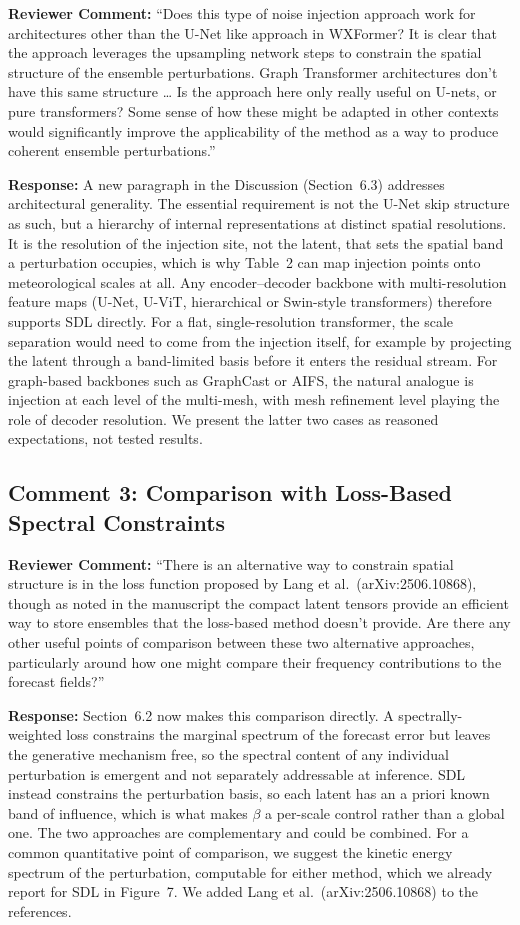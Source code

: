 \documentclass[12pt]{article}
\begin{document}
\textbf{Reviewer Comment:} ``Does this type of noise injection approach work for
architectures other than the U-Net like approach in WXFormer? It is clear that the
approach leverages the upsampling network steps to constrain the spatial structure of
the ensemble perturbations. Graph Transformer architectures don't have this same
structure \ldots{} Is the approach here only really useful on U-nets, or pure
transformers? Some sense of how these might be adapted in other contexts would
significantly improve the applicability of the method as a way to produce coherent
ensemble perturbations.''

\textbf{Response:} A new paragraph in the Discussion (Section~6.3) addresses
architectural generality. The essential requirement is not the U-Net skip
structure as such, but a hierarchy of internal representations at distinct spatial
resolutions. It is the resolution of the injection site, not the latent, that sets the
spatial band a perturbation occupies, which is why Table~2 can map injection points
onto meteorological scales at all. Any encoder--decoder backbone with multi-resolution
feature maps (U-Net, U-ViT, hierarchical or Swin-style transformers) therefore
supports SDL directly. For a flat, single-resolution transformer, the scale separation
would need to come from the injection itself, for example by projecting the
latent through a band-limited basis before it enters the residual stream. For
graph-based backbones such as GraphCast or AIFS, the natural analogue is injection at
each level of the multi-mesh, with mesh refinement level playing the role of decoder
resolution. We present the latter two cases as reasoned expectations, not tested
results.

\subsection*{Comment 3: Comparison with Loss-Based Spectral Constraints}

\textbf{Reviewer Comment:} ``There is an alternative way to constrain spatial
structure is in the loss function proposed by Lang et al.\ (arXiv:2506.10868), though
as noted in the manuscript the compact latent tensors provide an efficient way to
store ensembles that the loss-based method doesn't provide. Are there any other useful
points of comparison between these two alternative approaches, particularly around how
one might compare their frequency contributions to the forecast fields?''

\textbf{Response:} Section~6.2 now makes this comparison directly. A
spectrally-weighted loss constrains the marginal spectrum of the forecast
error but leaves the generative mechanism free, so the spectral content of any
individual perturbation is emergent and not separately addressable at inference. SDL
instead constrains the perturbation basis, so each latent has an a priori known band
of influence, which is what makes $\beta$ a per-scale control rather than a global
one. The two approaches are complementary and could be combined. For a common
quantitative point of comparison, we suggest the kinetic energy spectrum of the
perturbation, computable for either method, which we already report for SDL in
Figure~7. We added Lang et al.\ (arXiv:2506.10868) to the references.
\end{document}
